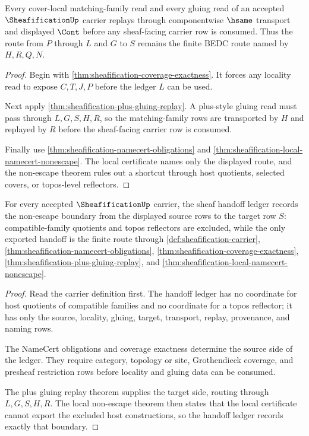 \begin{theorem}
\label{thm:sheafification-cover-local-gluing-obligation}
Every cover-local matching-family read and every gluing read of an accepted $\SheafificationUp$ carrier replays through componentwise $\hsame$ transport and displayed $\Cont$ before any sheaf-facing carrier row is consumed. Thus the route from $P$ through $L$ and $G$ to $S$ remains the finite BEDC route named by $H,R,Q,N$.
\end{theorem}
\begin{proof}
Begin with \autoref{thm:sheafification-coverage-exactness}. It forces any locality read to expose $C,T,J,P$ before the ledger $L$ can be used.

Next apply \autoref{thm:sheafification-plus-gluing-replay}. A plus-style gluing read must pass through $L,G,S,H,R$, so the matching-family rows are transported by $H$ and replayed by $R$ before the sheaf-facing carrier row is consumed.

Finally use \autoref{thm:sheafification-namecert-obligations} and \autoref{thm:sheafification-local-namecert-nonescape}. The local certificate names only the displayed route, and the non-escape theorem rules out a shortcut through host quotients, selected covers, or topos-level reflectors.
\end{proof}

\begin{theorem}
\label{thm:sheafification-sheaf-handoff-ledger-obligation}
For every accepted $\SheafificationUp$ carrier, the sheaf handoff ledger records the non-escape boundary from the displayed source rows to the target row $S$: compatible-family quotients and topos reflectors are excluded, while the only exported handoff is the finite route through \autoref{def:sheafification-carrier}, \autoref{thm:sheafification-namecert-obligations}, \autoref{thm:sheafification-coverage-exactness}, \autoref{thm:sheafification-plus-gluing-replay}, and \autoref{thm:sheafification-local-namecert-nonescape}.
\end{theorem}
\begin{proof}
Read the carrier definition first. The handoff ledger has no coordinate for host quotients of compatible families and no coordinate for a topos reflector; it has only the source, locality, gluing, target, transport, replay, provenance, and naming rows.

The NameCert obligations and coverage exactness determine the source side of the ledger. They require category, topology or site, Grothendieck coverage, and presheaf restriction rows before locality and gluing data can be consumed.

The plus gluing replay theorem supplies the target side, routing through $L,G,S,H,R$. The local non-escape theorem then states that the local certificate cannot export the excluded host constructions, so the handoff ledger records exactly that boundary.
\end{proof}

